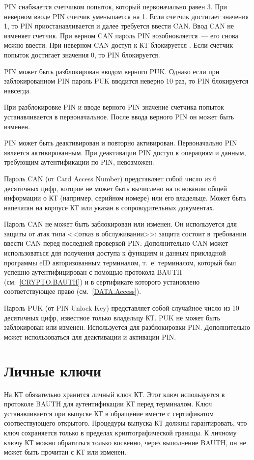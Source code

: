 PIN снабжается счетчиком попыток, который первоначально равен 3. При 
неверном вводе PIN счетчик уменьшается на 1. Если счетчик достигает 
значения 1, то PIN приостанавливается и далее требуется ввести CAN. 
Ввод CAN не изменяет счетчик. При верном CAN пароль PIN возобновляется~--- его 
снова можно ввести. При неверном CAN доступ к КТ блокируется . Если счетчик попыток достигает значения 0, то PIN блокируется.

PIN может быть разблокирован вводом верного PUK. Однако если при 
заблокированном PIN пароль PUK вводится неверно 10 раз, то PIN блокируется 
навсегда.

При разблокировке PIN и вводе верного PIN значение счетчика попыток 
устанавливается в первоначальное. После ввода верного PIN он  
может быть изменен. 

PIN может быть деактивирован и повторно активирован.
Первоначально PIN является активированным. При деактивации
PIN доступ к операциям и данным, требующим аутентификации по PIN, невозможен.

Пароль CAN (от Card Access Number) представляет собой число из 6 десятичных 
цифр, которое не может быть вычислено на основании общей информации о КТ 
(например, серийном номере) или его владельце. Может быть напечатан на корпусе 
КТ или указан в сопроводительных документах. 

Пароль CAN не может быть заблокирован или изменен. Он используется для защиты 
от атак типа <<отказ в обслуживании>>: защита состоит в требовании ввести CAN перед 
последней проверкой PIN. Дополнительно CAN может использоваться для 
получения доступа к функциям и данным прикладной программы eID 
авторизованным терминалом, т.~е. терминалом, который был успешно 
аутентифицирован с помощью протокола BAUTH (см.~\ref{CRYPTO.BAUTH}) и в 
сертификате которого установлено соответствующее право (см.~\ref{DATA.Access}). 

Пароль PUK (от PIN Unlock Key) представляет собой случайное число из 10 
десятичных цифр, известное только владельцу КТ. PUK не может быть заблокирован 
или изменен. Используется для разблокировки PIN. Дополнительно может использоваться 
для деактивации и активации PIN.

\section{Личные ключи}\label{OBJ.Keys}

На КТ обязательно хранится личный ключ КТ. Этот ключ используется в протоколе
BAUTH для аутентификации КТ перед терминалом. Ключ устанавливается при выпуске
КТ в обращение вместе с сертификатом соотвествующего открытого. 
Процедуры выпуска КТ должны гарантировать, что ключ сохраняется только в 
пределах криптографической границы. К личному ключу КТ можно обратиться только 
косвенно, через выполнение BAUTH, он не может быть прочитан с КТ или изменен.

